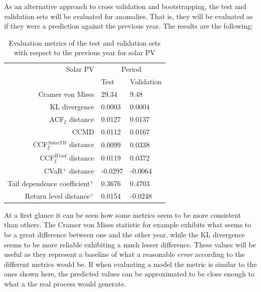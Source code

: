 As an alternative approach to cross validation and bootstrapping, the test and validation sets will be evaluated for anomalies. That is, they will be evaluated as if they were a prediction against the previous year. The results are the following:

\begin{table}[ht]
    \centering
    \begin{tabular}{rll}
        \toprule
        Solar PV & \multicolumn{2}{c}{Period} \\ 
        \cmidrule(lr){2-3}
            & Test & Validation \\
        \midrule
        Cramer von Mises & 29.34 & 9.48 \\
        KL divergence & 0.0003 & 0.0004 \\
        ACF$_\xi$ distance & 0.0127 & 0.0137 \\
        \midrule
        CCMD & 0.0112 & 0.0167 \\
        CCF$_\xi^{Solar TH}$ distance & 0.0099 & 0.0338\\
        CCF$_\xi^{Wind}$ distance & 0.0119 & 0.0372 \\
        \midrule
        CVaR$^+$ distance & -0.0297 & -0.0064 \\
        Tail dependence coefficient$^+$ & 0.3676 & 0.4703 \\
        Return level distance$^+$ & 0.0154 & -0.0248 \\
        \bottomrule
    \end{tabular}
    \caption{Evaluation metrics of the test and validation sets with respect to the previous year for solar PV}
    \label{table:eval-metrics-test-validation-solar-pv}
\end{table}

At a first glance it can be seen how some metrics seem to be more consistent than others. The Cramer von Mises statistic for example exhibits what seems to be a great difference between one and the other year, while the KL divergence seems to be more reliable exhibiting a much lesser difference. These values will be useful as they represent a baseline of what a reasonable \textit{error} according to the different metrics would be. If when evaluating a model the metric is similar to the ones shown here, the predicted values can be approximated to be close enough to what a the real process would generate. 

